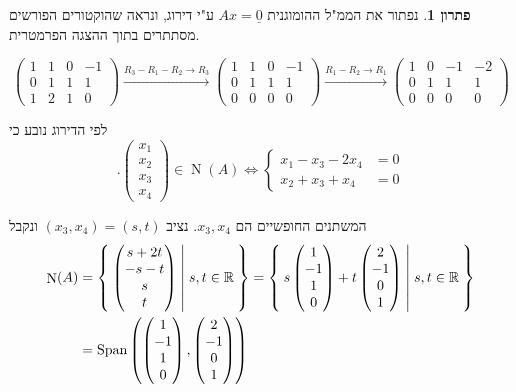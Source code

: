 \documentclass[12pt]{report}
\theoremstyle{plain}
\theoremstyle{definition}
\newtheorem*{solution}{פתרון}
\newcommand{\R}{\mathbb{R}}
\newcommand{\0}{\mathbf{0}}
\DeclareMathOperator{\Span}{Span}
\DeclareMathOperator{\Null}{N}
\begin{document}
\begin{solution}
נפתור את הממ"ל ההומוגנית 
$Ax=\underline{0}$
ע"י דירוג, ונראה שהוקטורים הפורשים מסתתרים בתוך ההצגה הפרמטרית.

$$
\begin{pmatrix}
1 & 1 & 0 & -1 \\
0 & 1 & 1 & 1 \\
1 & 2 & 1 & 0
\end{pmatrix}\xrightarrow{R_3-R_1-R_2\to R_3}\begin{pmatrix}
1 & 1 & 0 &-1\\
0 & 1 & 1 & 1 \\
0 & 0 & 0 & 0
\end{pmatrix}\xrightarrow{R_1-R_2\to R_1}\begin{pmatrix}
1 & 0 & -1 & -2\\
0 & 1 & 1 & 1\\
0 & 0 & 0 & 0
\end{pmatrix}
$$

לפי הדירוג נובע כי
$$
.\begin{pmatrix}
    x_1 \\
    x_2 \\
    x_3 \\
    x_4
\end{pmatrix}\in \Null(A) \iff \begin{cases}
    x_1-x_3-2x_4&=0 \\
    x_2+x_3+x_4&=0
\end{cases}
$$

המשתנים החופשיים הם 
$x_3,x_4$.
נציב
$(x_3,x_4)=(s,t)$
ונקבל
$$
\begin{aligned}
\Null(A)&=\Set{\begin{pmatrix}
s+2t\\
-s-t\\
s\\
t
\end{pmatrix}|s,t\in\R}=\Set{s\begin{pmatrix}
1\\
-1\\
1\\
0
\end{pmatrix}+t\begin{pmatrix}
2\\
-1\\
0\\
1
\end{pmatrix}|s,t\in\R}\\
&=\Span\left(\begin{pmatrix}
1\\
-1\\
1\\
0
\end{pmatrix},\begin{pmatrix}
2\\
-1\\
0\\
1
\end{pmatrix}\right)
\end{aligned}
$$


\end{solution}
\end{document}
